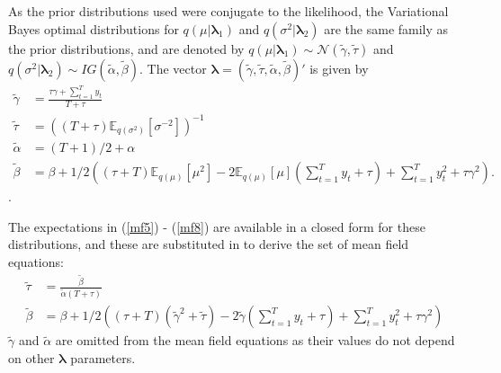 \documentclass[12pt,a4paper]{article}%
\numberwithin{equation}{section}
\begin{document}
As the prior distributions used were conjugate to the likelihood, the Variational Bayes optimal distributions for $q(\mu |  \boldsymbol{\lambda}_1)$ and $q(\sigma^2 | \boldsymbol{\lambda}_2)$ are the same family as the prior distributions, and are denoted by $q(\mu | \boldsymbol{\lambda}_1) \sim \mathcal{N}(\tilde{\gamma}, \tilde{\tau})$ and $q(\sigma^2 | \boldsymbol{\lambda}_2) \sim IG(\tilde{\alpha}, \tilde{\beta})$. The vector $\boldsymbol{\lambda} = (\tilde{\gamma}, \tilde{\tau}, \tilde{\alpha}, \tilde{\beta})'$ is given by
\begin{align}
\tilde{\gamma} &= \frac{\tau \gamma + \sum_{t=1}^{T} y_t}{T + \tau}  \label{mf5} \\ 
\tilde{\tau} &= \left((T + \tau)\mathbb{E}_{q(\sigma^2)}[\sigma^{-2}]\right )^{-1} \label{mf6} \\
\tilde{\alpha} &= (T+1)/2 + \alpha  \label{mf7} \\
\tilde{\beta} &= \beta + 1/2\left((\tau + T)\mathbb{E}_{q(\mu)}[\mu^2 ]- 2 \mathbb{E}_{q(\mu)}[\mu ]\left(\sum_{t=1}^{T}y_t + \tau\right) + \sum_{t=1}^{T} y_t^2 + \tau \gamma^2 \right). \label{mf8}
\end{align}.

The expectations in (\ref{mf5}) - (\ref{mf8}) are available in a closed form for these distributions, and these are substituted in to derive the set of mean field equations:
\begin{align}
\tilde{\tau} &= \frac{\tilde{\beta}}{\tilde{\alpha}(T + \tau)} \label{mf9} \\
\tilde{\beta} &= \beta + 1/2\left((\tau + T)(\tilde{\gamma}^2 + \tilde{\tau}) - 2 \tilde{\gamma}\left(\sum_{t=1}^{T}y_t + \tau\right) + \sum_{t=1}^{T} y_t^2 + \tau \gamma^2 \right)\label{mf10}
\end{align}
$\tilde{\gamma}$ and $\tilde{\alpha}$ are omitted from the mean field equations as their values do not depend on other $\boldsymbol{\lambda}$ parameters. 
\end{document}
